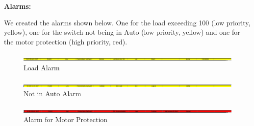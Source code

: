 \newpage
\textbf{Alarms:}

We created the alarms shown below. One for the load exceeding 100 (low priority, yellow), one for the switch not being in Auto (low priority, yellow) and one for the motor protection (high priority, red).

\begin{figure}[!htb]
    \centering
    \centerline{\includegraphics[width=1.5\textwidth]{images/alarm1}}
    \caption{Load Alarm}
    \end{figure}
    

\begin{figure}[!htb]
    \centering
    \centerline{\includegraphics[width=1.5\textwidth]{images/Alarm2}}
    \caption{Not in Auto Alarm}
    \end{figure}
    

\begin{figure}[!htb]
    \centering
    \centerline{\includegraphics[width=1.5\textwidth]{images/Alarm3}}
    \caption{Alarm for Motor Protection}
    \end{figure}









